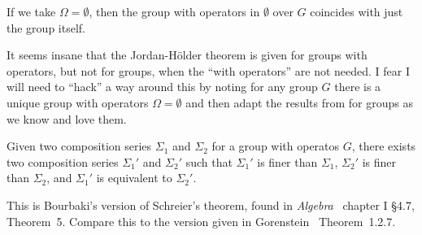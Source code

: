 \begin{def-remark}
If we take $\Omega=\emptyset$, then the group with operators in
$\emptyset$ over $G$ coincides with just the group itself.
\end{def-remark}

\begin{def-remark}
It seems insane that the Jordan-H\"older theorem is given for groups
with operators, but not for groups, when the ``with operators'' are not
needed. I fear I will need to ``hack'' a way around this by noting for
any group $G$ there is a unique group with operators $\Omega=\emptyset$
and then adapt the results from  for groups as we know and
love them.
\end{def-remark}

\begin{theorem}
Given two composition series $\Sigma_{1}$ and $\Sigma_{2}$ for a group
with operatos $G$, there exists two composition series $\Sigma_{1}'$ and $\Sigma_{2}'$
such that $\Sigma_{1}'$ is finer than $\Sigma_{1}$, $\Sigma_{2}'$ is
finer than $\Sigma_{2}$, and $\Sigma_{1}'$ is equivalent to $\Sigma_{2}'$.
\end{theorem}

\begin{thm-remark}
This is Bourbaki's version of Schreier's theorem, found in \emph{Algebra}~\cite{bourbaki1974elements}
chapter I \S4{.}7, Theorem~5. Compare this to the version given in
Gorenstein~\cite{gorenstein1980finite} Theorem~1{.}2{.}7.
\end{thm-remark}
